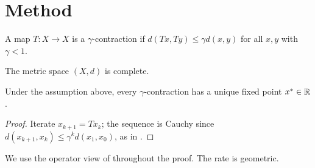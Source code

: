 \section{Method}
\begin{definition}[Contraction]\label{def:contraction}
A map $T: X \to X$ is a $\gamma$-contraction if $d(Tx, Ty) \le \gamma d(x,y)$ for all $x, y$ with $\gamma < 1$.
\end{definition}
\begin{assump}\label{as:complete}
The metric space $(X, d)$ is complete.
\end{assump}
\begin{thm}[Banach]\label{thm:main}
Under the assumption above, every $\gamma$-contraction has a unique fixed point $x^* \in \mathbb{R}$.
\end{thm}
\begin{proof}
Iterate $x_{k+1} = T x_k$; the sequence is Cauchy since $d(x_{k+1}, x_k) \le \gamma^k d(x_1, x_0)$, as in \cite{banach1922}.
\end{proof}
We use the operator view of \citet{bellman1957} throughout the proof. The rate is geometric.
